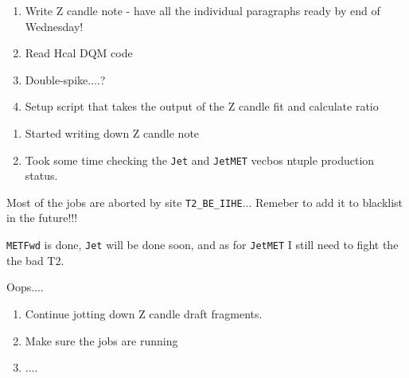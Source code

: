 

\begin{enumerate}
\item Write Z candle note - have all the individual paragraphs ready by end of Wednesday!
\item Read Hcal DQM code
\item Double-spike....?
\item Setup script that takes the output of the Z candle fit and calculate ratio
\end{enumerate}


\begin{enumerate}
\item Started writing down Z candle note
\item Took some time checking the \texttt{Jet} and \texttt{JetMET} vecbos ntuple production status.
\end{enumerate}


Most of the jobs are aborted by site \texttt{T2\_BE\_IIHE}... Remeber to add it to blacklist in the future!!!

\texttt{METFwd} is done, \texttt{Jet} will be done soon, and as for \texttt{JetMET} I still need to fight the the bad T2.


Oops....


\begin{enumerate}
\item Continue jotting down Z candle draft fragments.
\item Make sure the jobs are running
\item ....
\end{enumerate}


